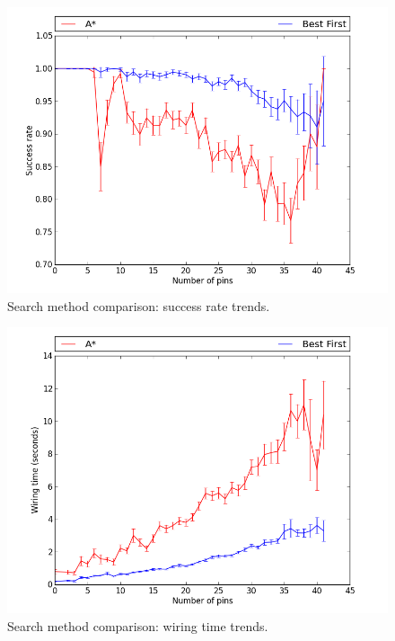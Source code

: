 \begin{figure}[H]
\begin{center}
\includegraphics[width=\textwidth]{Images/search_success_trend_comparison.png}
\caption{Search method comparison: success rate trends.}
\label{fig:search_success_trend}
\end{center}
\end{figure}

\begin{figure}[H]
\begin{center}
\includegraphics[width=\textwidth]{Images/search_time_trend_comparison.png}
\caption{Search method comparison: wiring time trends.}
\label{fig:search_time_trend}
\end{center}
\end{figure}

